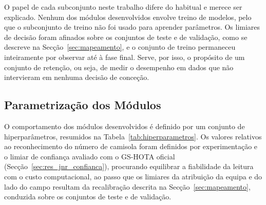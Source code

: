O papel de cada subconjunto neste trabalho difere do habitual e merece ser explicado. Nenhum dos módulos desenvolvidos envolve treino de modelos, pelo que o subconjunto de treino não foi usado para aprender parâmetros. Os limiares de decisão foram afinados sobre os conjuntos de teste e de validação, como se descreve na Secção~\ref{sec:mapeamento}, e o conjunto de treino permaneceu inteiramente por observar até à fase final. Serve, por isso, o propósito de um conjunto de retenção, ou seja, de medir o desempenho em dados que não intervieram em nenhuma decisão de conceção.

\subsection{Parametrização dos Módulos}

O comportamento dos módulos desenvolvidos é definido por um conjunto de hiperparâmetros, resumidos na Tabela~\ref{tab:hiperparametros}. Os valores relativos ao reconhecimento do número de camisola foram definidos por experimentação e o limiar de confiança avaliado com o GS-HOTA oficial (Secção~\ref{sec:res_jnr_confianca}), procurando equilibrar a fiabilidade da leitura com o custo computacional, ao passo que os limiares da atribuição da equipa e do lado do campo resultam da recalibração descrita na Secção~\ref{sec:mapeamento}, conduzida sobre os conjuntos de teste e de validação.


